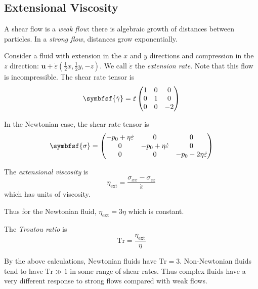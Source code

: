 \documentclass{jknotes}
\begin{document}
\subsection{Extensional Viscosity}
A shear flow is a \emph{weak flow}: there is algebraic growth of distances
between particles. In a \emph{strong flow}, distances grow exponentially.

Consider a fluid with extension in the $x$ and $y$ directions and compression
in the $z$ direction: $\symbf{u} +
\dot{\varepsilon}\left(\frac{1}{2}x,\frac{1}{2}y, -z\right)$. We call
$\dot{\varepsilon}$ the \emph{extension rate}. Note that this flow is
incompressible. The shear rate tensor is
\begin{equation}
	\symbfsf{\srate} = \dot{\varepsilon}\begin{pmatrix} 1 & 0 & 0 \\ 0 &
	1 & 0 \\ 0 & 0 & -2 \end{pmatrix}
\end{equation}

In the Newtonian case, the shear rate tensor is
\begin{equation}
	\symbfsf{\sigma} = \begin{pmatrix}
		-p_0 + \eta \dot{\varepsilon} & 0  & 0 \\
		0 & -p_0 + \eta \dot{\varepsilon} & 0 \\
		0 & 0 & -p_0 -2 \eta \dot{\varepsilon} 
	\end{pmatrix}
\end{equation}

\begin{defn}
	The \emph{extensional viscosity} is
	\begin{equation}
		\eta_{\text{ext}} = \frac{\sigma_{xx}-\sigma_{zz}}{\dot{\varepsilon}}
	\end{equation}
	which has units of viscosity.
\end{defn}

Thus for the Newtonian fluid, $\eta_{\text{ext}} = 3\eta$ which is constant. 
\begin{defn}
	The \emph{Troutou ratio} is 
	\begin{equation}
		\text{Tr} = \frac{\eta_{\text{ext}}}{\eta}
	\end{equation}
\end{defn}

By the above calculations, Newtonian fluids have $\text{Tr} = 3$.
Non-Newtonian fluids tend to have $\text{Tr} \gg 1$ in some range of shear
rates. Thus complex fluids have a very different response to strong flows
compared with weak flows.
\end{document}
